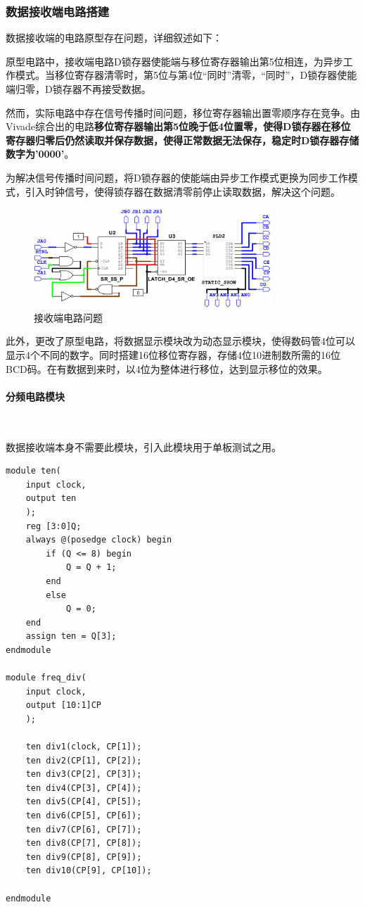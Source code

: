 \documentclass[UTF8]{ctexart}
\numberwithin{figure}{subsection}
\numberwithin{table}{subsection}
\numberwithin{equation}{subsection}
\begin{document}
\subsubsection{数据接收端电路搭建}
\par 数据接收端的电路原型存在问题，详细叙述如下：
\par 原型电路中，接收端电路D锁存器使能端与移位寄存器输出第5位相连，为异步工作模式。当移位寄存器清零时，第5位与第4位“同时”清零，“同时”，D锁存器使能端归零，D锁存器不再接受数据。
\par 然而，实际电路中存在信号传播时间问题，移位寄存器输出置零顺序存在竞争。由Vivade综合出的电路\textbf{移位寄存器输出第5位晚于低4位置零，使得D锁存器在移位寄存器归零后仍然读取并保存数据，使得正常数据无法保存，稳定时D锁存器存储数字为'0000'}。
\par 为解决信号传播时间问题，将D锁存器的使能端由异步工作模式更换为同步工作模式，引入时钟信号，使得锁存器在数据清零前停止读取数据，解决这个问题。
\begin{figure}[H]
    \begin{center}
        \includegraphics[width=0.8\textwidth]{pics/DataSR/receiver problem.png}
    \end{center}
    \caption{接收端电路问题}
    \label{receiver problem}
\end{figure}

\par 此外，更改了原型电路，将数据显示模块改为动态显示模块，使得数码管4位可以显示4个不同的数字。同时搭建16位移位寄存器，存储4位10进制数所需的16位BCD码。在有数据到来时，以4位为整体进行移位，达到显示移位的效果。


\paragraph{分频电路模块}~
\par 数据接收端本身不需要此模块，引入此模块用于单板测试之用。
\begin{lstlisting}[style={verilog-style}]
module ten(
    input clock,
    output ten
    );
    reg [3:0]Q;
    always @(posedge clock) begin
        if (Q <= 8) begin
            Q = Q + 1;
        end
        else
            Q = 0;
    end
    assign ten = Q[3];
endmodule

module freq_div(
    input clock,
    output [10:1]CP
    );

    ten div1(clock, CP[1]);
    ten div2(CP[1], CP[2]);
    ten div3(CP[2], CP[3]);
    ten div4(CP[3], CP[4]);
    ten div5(CP[4], CP[5]);
    ten div6(CP[5], CP[6]);
    ten div7(CP[6], CP[7]);
    ten div8(CP[7], CP[8]);
    ten div9(CP[8], CP[9]);
    ten div10(CP[9], CP[10]);
    
endmodule
\end{lstlisting}
\end{document}
